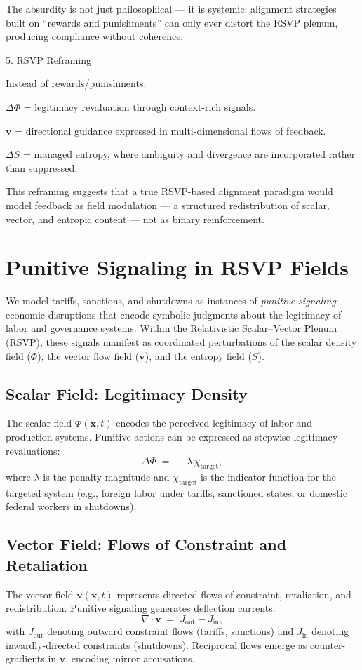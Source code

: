 \documentclass{article}
\begin{document}
The absurdity is not just philosophical — it is systemic: alignment strategies built on “rewards and punishments” can only ever distort the RSVP plenum, producing compliance without coherence.


5. RSVP Reframing

Instead of rewards/punishments:

$\Delta \Phi$ = legitimacy revaluation through context-rich signals.

$\mathbf{v}$ = directional guidance expressed in multi-dimensional flows of feedback.

$\Delta S$ = managed entropy, where ambiguity and divergence are incorporated rather than suppressed.


This reframing suggests that a true RSVP-based alignment paradigm would model feedback as field modulation — a structured redistribution of scalar, vector, and entropic content — not as binary reinforcement.

\section{Punitive Signaling in RSVP Fields}
\label{sec:punitive-signaling}

We model tariffs, sanctions, and shutdowns as instances of \emph{punitive signaling}: 
economic disruptions that encode symbolic judgments about the legitimacy of labor 
and governance systems. Within the Relativistic Scalar--Vector Plenum (RSVP), 
these signals manifest as coordinated perturbations of the scalar density field 
($\Phi$), the vector flow field ($\mathbf{v}$), and the entropy field ($S$). 

\subsection{Scalar Field: Legitimacy Density}
The scalar field $\Phi(\mathbf{x},t)$ encodes the perceived legitimacy of labor and 
production systems. Punitive actions can be expressed as stepwise legitimacy 
revaluations:
\[
\Delta \Phi \;=\; - \lambda \, \chi_{\text{target}} ,
\]
where $\lambda$ is the penalty magnitude and $\chi_{\text{target}}$ is the indicator 
function for the targeted system (e.g., foreign labor under tariffs, sanctioned 
states, or domestic federal workers in shutdowns). 

\subsection{Vector Field: Flows of Constraint and Retaliation}
The vector field $\mathbf{v}(\mathbf{x},t)$ represents directed flows of constraint, 
retaliation, and redistribution. Punitive signaling generates deflection currents:
\[
\nabla \cdot \mathbf{v} \;=\; J_{\text{out}} - J_{\text{in}} ,
\]
with $J_{\text{out}}$ denoting outward constraint flows (tariffs, sanctions) and 
$J_{\text{in}}$ denoting inwardly-directed constraints (shutdowns). Reciprocal flows 
emerge as counter-gradients in $\mathbf{v}$, encoding mirror accusations. 
\end{document}
